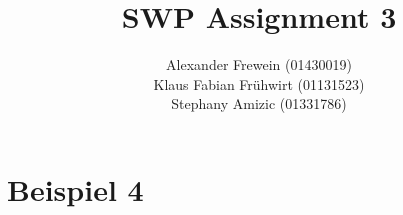 \documentclass[12pt,runningheads,a4paper]{llncs}
\begin{document}
\title{SWP Assignment 3}


%
%
\author{Alexander Frewein (01430019)\\
		Klaus Fabian Frühwirt (01131523)\\
		Stephany Amizic (01331786)}

%




\maketitle
\section*{Beispiel 4}
\end{document}
